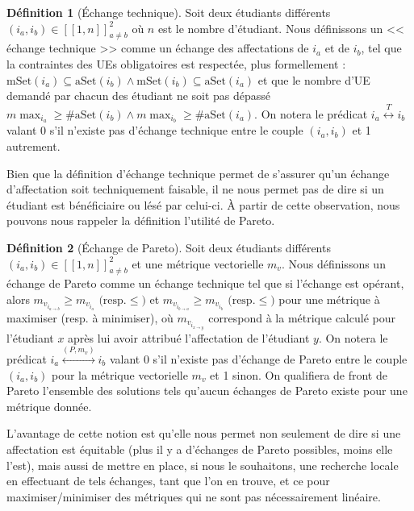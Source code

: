 \documentclass{rapport}
\theoremstyle{definition}
\newtheorem{definition}{Définition}
\theoremstyle{remark}
\theoremstyle{plain}
\theoremstyle{definition}
\theoremstyle{remark}
\begin{document}
\begin{definition}[Échange technique]
    Soit deux étudiants différents $\left(i_a,i_b\right)\in[\![1,n]\!]^2_{a\ne b}$ où $n$ est le nombre d'étudiant.
    Nous définissons un << échange technique >> comme un échange des affectations de $i_a$ et de $i_b$, tel que la contraintes des UEs obligatoires est respectée, plus formellement : $\text{mSet}(i_a)\subseteq\text{aSet}(i_b) \land \text{mSet}(i_b)\subseteq\text{aSet}(i_a)$
    et que le nombre d'UE demandé par chacun des étudiant ne soit pas dépassé $m\!\max_{i_a}\ge\#\text{aSet}(i_b)\land m\!\max_{i_b}\ge\#\text{aSet}(i_a)$.
    On notera le prédicat $i_a\stackrel{T}{\longleftrightarrow} i_b$ valant 0 s'il n'existe pas d'échange technique entre le couple $(i_a, i_b)$ et 1 autrement.
\end{definition}

Bien que la définition d'échange technique permet de s'assurer qu'un échange d'affectation soit techniquement faisable, il ne nous permet pas de dire si un étudiant est bénéficiaire ou lésé par celui-ci.
À partir de cette observation, nous pouvons nous rappeler la définition l'utilité de Pareto.
\begin{definition}[Échange de Pareto]
    Soit deux étudiants différents $\left(i_a,i_b\right)\in[\![1,n]\!]^2_{a\ne b}$ et une métrique vectorielle $m_v$.
    Nous définissons un échange de Pareto comme un échange technique tel que si l'échange est opérant, alors $m_{v_{i_{a\to b}}} \ge m_{v_{i_a}}\text{ (resp.}\le\text{)}$ et $m_{v_{i_{b\to a}}} \ge m_{v_{i_b}}\text{ (resp.}\le\text{)}$ pour une métrique à maximiser (resp. à minimiser),
    où $m_{v_{i_{x\to y}}}$ correspond à la métrique calculé pour l'étudiant $x$ après lui avoir attribué l'affectation de l'étudiant $y$.
    On notera le prédicat $i_a\stackrel{(P,m_v)}{\longleftrightarrow} i_b$ valant 0 s'il n'existe pas d'échange de Pareto entre le couple $(i_a, i_b)$ pour la métrique vectorielle $m_v$ et 1 sinon.
    On qualifiera de front de Pareto l'ensemble des solutions tels qu'aucun échanges de Pareto existe pour une métrique donnée.
\end{definition}

L'avantage de cette notion est qu'elle nous permet non seulement de dire si une affectation est équitable (plus il y a d'échanges de Pareto possibles, moins elle l'est),
mais aussi de mettre en place, si nous le souhaitons, une recherche locale en effectuant de tels échanges, tant que l'on en trouve, et ce pour maximiser/minimiser des métriques qui ne sont pas nécessairement linéaire.
\end{document}
